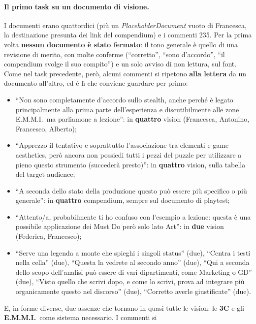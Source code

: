 \paragraph{Il primo task su un documento di visione.} I documenti erano
quattordici (più un \emph{PlaceholderDocument} vuoto di Francesca, la
destinazione presunta dei link del compendium) e i commenti 235. Per la
prima volta \textbf{nessun documento è stato fermato}: il tono generale è
quello di una revisione di merito, con molte conferme (``corretto'', ``sono
d'accordo'', ``il compendium svolge il suo compito'') e un solo avviso di non
lettura, sul font. Come nel task precedente, però, alcuni commenti si
ripetono \textbf{alla lettera} da un documento all'altro, ed è lì che conviene
guardare per primo:
\begin{itemize}
  \item ``Non sono completamente d'accordo sullo stealth, anche perché è
        legato principalmente alla prima parte dell'esperienza e
        discutibilmente alle zone E.M.M.I.\ ma parliamone a lezione'': in
        \textbf{quattro} vision (Francesca, Antonino, Francesco, Alberto);
  \item ``Apprezzo il tentativo e soprattutto l'associazione tra elementi e
        game aesthetics, però ancora non possiedi tutti i pezzi del puzzle
        per utilizzare a pieno questo strumento (succederà presto)'': in
        \textbf{quattro} vision, sulla tabella del target audience;
  \item ``A seconda dello stato della produzione questo può essere più
        specifico o più generale'': in \textbf{quattro} compendium, sempre
        sul documento di playtest;
  \item ``Attento/a, probabilmente ti ho confuso con l'esempio a lezione:
        questa è una possibile applicazione dei Must Do però solo lato
        Art'': in \textbf{due} vision (Federica, Francesco);
  \item ``Serve una legenda a monte che spieghi i singoli status'' (due),
        ``Centra i testi nella cella'' (due), ``Questa la vedrete al secondo
        anno'' (due), ``Qui a seconda dello scopo dell'analisi può essere di
        vari dipartimenti, come Marketing o GD'' (due), ``Visto quello che
        scrivi dopo, e come lo scrivi, prova ad integrare più organicamente
        questo nel discorso'' (due), ``Corretto averle giustificate'' (due).
\end{itemize}
E, in forme diverse, due assenze che tornano in quasi tutte le vision: le
\textbf{3C} e gli \textbf{E.M.M.I.}\ come sistema necessario. I commenti si
